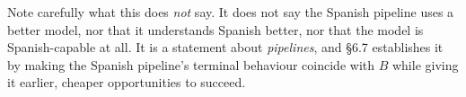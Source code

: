 Note carefully what this does \emph{not} say. It does not say the Spanish pipeline uses a better model, nor that it understands Spanish better, nor that the model is Spanish-capable at all. It is a statement about \emph{pipelines}, and \S6.7 establishes it by making the Spanish pipeline's terminal behaviour coincide with $B$ while giving it earlier, cheaper opportunities to succeed.
